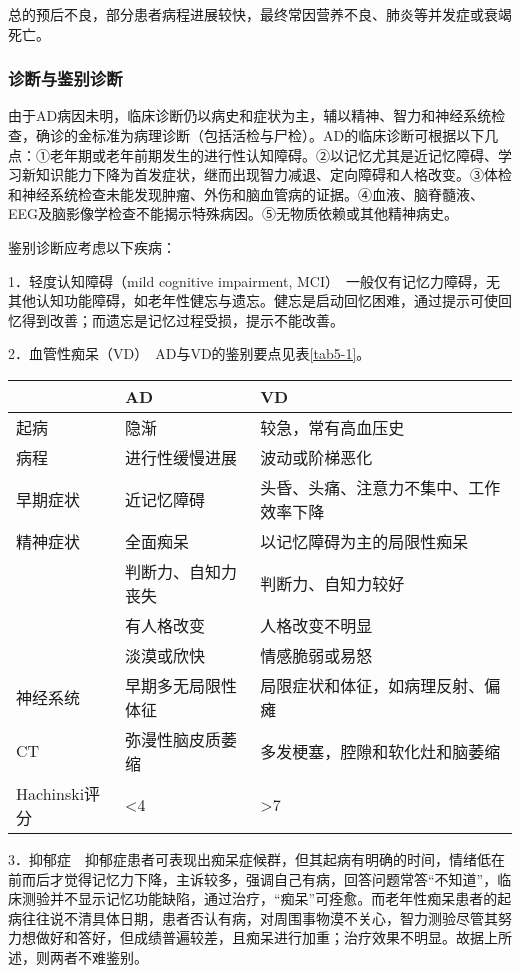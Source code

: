总的预后不良，部分患者病程进展较快，最终常因营养不良、肺炎等并发症或衰竭死亡。

\subsubsection{诊断与鉴别诊断}

由于AD病因未明，临床诊断仍以病史和症状为主，辅以精神、智力和神经系统检查，确诊的金标准为病理诊断（包括活检与尸检）。AD的临床诊断可根据以下几点：①老年期或老年前期发生的进行性认知障碍。②以记忆尤其是近记忆障碍、学习新知识能力下降为首发症状，继而出现智力减退、定向障碍和人格改变。③体检和神经系统检查未能发现肿瘤、外伤和脑血管病的证据。④血液、脑脊髓液、EEG及脑影像学检查不能揭示特殊病因。⑤无物质依赖或其他精神病史。

鉴别诊断应考虑以下疾病：

1．轻度认知障碍（mild cognitive impairment,
MCI）　一般仅有记忆力障碍，无其他认知功能障碍，如老年性健忘与遗忘。健忘是启动回忆困难，通过提示可使回忆得到改善；而遗忘是记忆过程受损，提示不能改善。

2．血管性痴呆（VD）　AD与VD的鉴别要点见表\ref{tab5-1}。

\begin{table}[ht]
    \caption{AD与VD的鉴别}
    \label{tab5-1}
    \centering
    \begin{longtable}{lp{5cm}p{7cm}}
    \toprule
    & AD & VD \\
    \midrule
    起病 & 隐渐 & 较急，常有高血压史\\
    病程 & 进行性缓慢进展 & 波动或阶梯恶化\\
    早期症状 & 近记忆障碍 & 头昏、头痛、注意力不集中、工作效率下降\\
    精神症状 & 全面痴呆 & 以记忆障碍为主的局限性痴呆\\
    & 判断力、自知力丧失 & 判断力、自知力较好\\
    & 有人格改变 & 人格改变不明显 \\
    & 淡漠或欣快 & 情感脆弱或易怒 \\
    神经系统 & 早期多无局限性体征 & 局限症状和体征，如病理反射、偏瘫\\
    CT & 弥漫性脑皮质萎缩 & 多发梗塞，腔隙和软化灶和脑萎缩\\
    Hachinski评分 & <4 & >7\\
    \bottomrule
    \end{longtable}
  \end{table}

3．抑郁症　抑郁症患者可表现出痴呆症候群，但其起病有明确的时间，情绪低在前而后才觉得记忆力下降，主诉较多，强调自己有病，回答问题常答“不知道”，临床测验并不显示记忆功能缺陷，通过治疗，“痴呆”可痊愈。而老年性痴呆患者的起病往往说不清具体日期，患者否认有病，对周围事物漠不关心，智力测验尽管其努力想做好和答好，但成绩普遍较差，且痴呆进行加重；治疗效果不明显。故据上所述，则两者不难鉴别。


